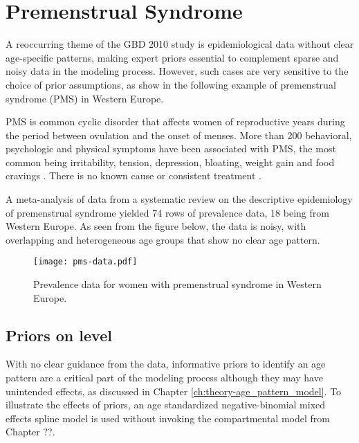 \chapter{Premenstrual Syndrome}
\label{applications-priors_knots_select}

A reoccurring theme of the GBD 2010 study is epidemiological data without clear age-specific patterns, making expert priors essential to complement sparse and noisy data in the modeling process.  However, such cases are very sensitive to the choice of prior assumptions, as show in the following example of premenstrual syndrome (PMS) in Western Europe.

PMS is common cyclic disorder that affects women of reproductive years during the period between ovulation and the onset of menses.  More than 200 behavioral, psychologic and physical symptoms have been associated with PMS, the most common being irritability, tension, depression, bloating, weight gain and food cravings \cite{dickerson_premenstrual_2003, singh_incidence_1998}.  There is no known cause or consistent treatment \cite{goodale_alleviation_1990}.

A meta-analysis of data from a systematic review on the descriptive epidemiology of premenstrual syndrome yielded 74 rows of prevalence data, 18 being from Western Europe.  As seen from the figure below, the data is noisy, with overlapping and heterogeneous age groups that show no clear age pattern.

    \begin{figure}
        \begin{center}
            \texttt{[image: pms-data.pdf]}
        \end{center}
        \caption{Prevalence data for women with premenstrual syndrome in Western Europe.}
        \label{fig:app-pms_data}
    \end{figure}

\section{Priors on level} \label{sec:app-priors_on_level}
With no clear guidance from the data, informative priors to identify an age pattern are a critical part of the modeling process although they may have unintended effects, as discussed in Chapter \ref{ch:theory-age_pattern_model}.  To illustrate the effects of priors, an age standardized negative-binomial mixed effects spline model is used without invoking the compartmental model from Chapter ??.

